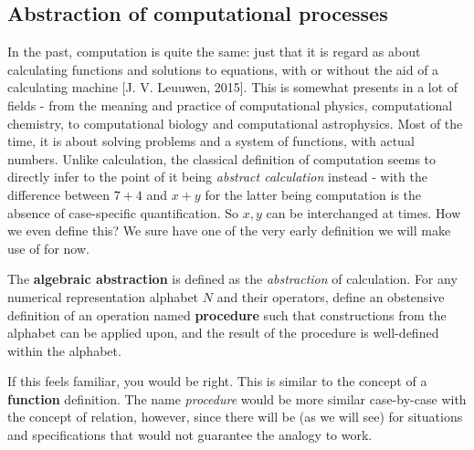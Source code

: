 \subsection{Abstraction of computational processes}

In the past, computation is quite the same: just that it is regard as about calculating functions and solutions to equations, with or without the aid of a calculating machine [J. V. Leuuwen, 2015]. This is somewhat presents in a lot of fields - from the meaning and practice of computational physics, computational chemistry, to computational biology and computational astrophysics. Most of the time, it is about solving problems and a system of functions, with actual numbers. Unlike calculation, the classical definition of computation seems to directly infer to the point of it being \textit{abstract calculation} instead - with the difference between $7+4$ and $x+y$ for the latter being computation is the absence of case-specific quantification. So $x,y$ can be interchanged at times. How we even define this? We sure have one of the very early definition we will make use of for now. 

\begin{definition}[Abstraction, 1]
    The \textbf{algebraic abstraction} is defined as the \textit{abstraction} of calculation. For any numerical representation alphabet $N$ and their operators, define an obstensive definition of an operation named \textbf{procedure} such that constructions from the alphabet can be applied upon, and the result of the procedure is well-defined within the alphabet. 
\end{definition}

If this feels familiar, you would be right. This is similar to the concept of a \textbf{function} definition. The name \textit{procedure} would be more similar case-by-case with the concept of relation, however, since there will be (as we will see) for situations and specifications that would not guarantee the analogy to work. 

